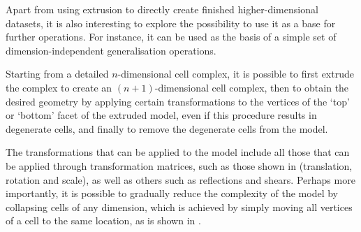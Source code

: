 Apart from using extrusion to directly create finished higher-dimensional datasets, it is also interesting to explore the possibility to use it as a base for further operations.
For instance, it can be used as the basis of a simple set of dimension-independent generalisation operations.

Starting from a detailed $n$-dimensional cell complex, it is possible to first extrude the complex to create an $(n+1)$-dimensional cell complex, then to obtain the desired geometry by applying certain transformations to the vertices of the `top' or `bottom' facet of the extruded model, even if this procedure results in degenerate cells, and finally to remove the degenerate cells from the model.

The transformations that can be applied to the model include all those that can be applied through transformation matrices, such as those shown in  (translation, rotation and scale), as well as others such as reflections and shears.
Perhaps more importantly, it is possible to gradually reduce the complexity of the model by collapsing cells of any dimension, which is achieved by simply moving all vertices of a cell to the same location, as is shown in .
